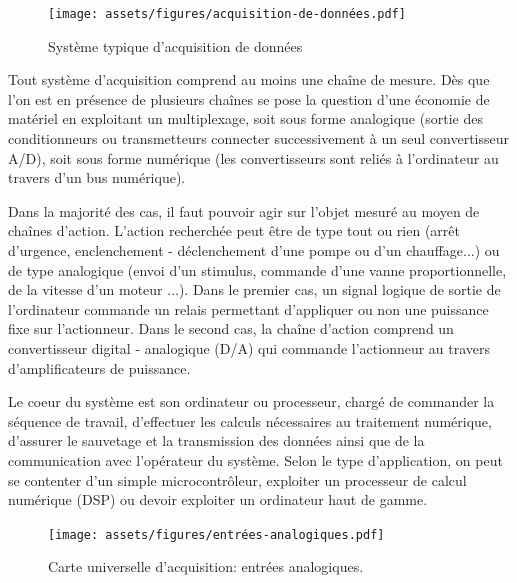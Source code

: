 \begin{figure}[h]
    \centering
    \texttt{[image: assets/figures/acquisition-de-données.pdf]}
    \caption{Système typique d'acquisition de données}
    \label{fig:SystemeTypiquedAcquisitionDeDonnees}
\end{figure}

Tout système d'acquisition comprend au moins une chaîne de mesure. Dès que l'on est en présence de plusieurs chaînes se pose la question d'une économie de matériel en exploitant un multiplexage, soit sous forme analogique (sortie des conditionneurs ou transmetteurs connecter successivement à un seul convertisseur A/D), soit sous forme numérique (les convertisseurs sont reliés à l'ordinateur au travers d'un bus numérique).

Dans la majorité des cas, il faut pouvoir agir sur l'objet mesuré au moyen de chaînes d'action. L'action recherchée peut être de type tout ou rien (arrêt d'urgence, enclenchement - déclenchement d'une pompe ou d'un chauffage...) ou de type analogique (envoi d'un stimulus, commande d'une vanne proportionnelle, de la vitesse d'un moteur ...). Dans le premier cas, un signal logique de sortie de l'ordinateur commande un relais permettant d'appliquer ou non une puissance fixe sur l'actionneur. Dans le second cas, la chaîne d'action comprend un convertisseur digital - analogique (D/A) qui commande l'actionneur au travers d'amplificateurs de puissance.

Le coeur du système est son ordinateur ou processeur, chargé de commander la séquence de travail, d'effectuer les calculs nécessaires au traitement numérique, d'assurer le sauvetage et la transmission des données ainsi que de la communication avec l'opérateur du système. Selon le type d'application, on peut se contenter d'un simple microcontrôleur, exploiter un processeur de calcul numérique (DSP) ou devoir exploiter un ordinateur haut de gamme.

\begin{figure}[ht]
    \centering
    \texttt{[image: assets/figures/entrées-analogiques.pdf]}
    \caption{Carte universelle d'acquisition: entrées analogiques.}
    \label{fig:Analog_Frontend}
\end{figure}

